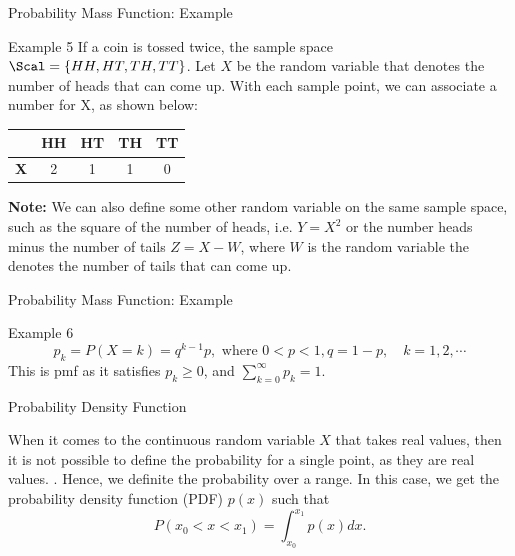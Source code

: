 \documentclass[aspectratio=169,xcolor=dvipsnames,svgnames,x11names,fleqn]{beamer}
\begin{document}
\begin{frame}[containsverbatim]{Probability Mass Function: Example}
    
    
    \begin{exampleblock}{Example 5}
    If a coin is tossed twice, the sample space $\Scal = \{HH, HT, TH, TT\}$. Let $X$ be the random variable that denotes the number of heads that can come up. With each sample point, we can associate a number for X, as shown below:
    
    \begin{tabular}{|c|c|c|c|c|}
    \hline
     & \textbf{HH} & \textbf{HT} & \textbf{TH} & \textbf{TT} \\
    \hline
    \textbf{X} & 2 & 1 & 1 & 0 \\
    \hline
    \end{tabular}
    \newline
    \newline
    \textbf{Note:} We can also define some other random variable on the same sample space, such as the square of the number of heads, i.e. $Y = X^2$ or the number heads minus the number of tails $Z = X - W$, where $W$ is the random variable the denotes the number of tails that can come up.
    \end{exampleblock}

\end{frame}

\begin{frame}[containsverbatim]{Probability Mass Function: Example}
    
    
    \begin{exampleblock}{Example 6}
        \begin{equation}
            p_k = P(X = k) = q^{k-1} p, \text{~where~} 0 < p < 1 , q = 1 - p, \quad k = 1, 2, \cdots
        \end{equation}
        This is pmf as it satisfies $p_k \geq 0$, and $\sum_{k=0}^\infty p_k = 1.$
    \end{exampleblock}

\end{frame}

\begin{frame}[containsverbatim]{Probability Density Function}
    
    
    When it comes to the continuous random variable $X$ that takes real values, then it is not possible to define the probability for a single point, as they are real values. {\color{red}{At what real value we should define a probability -- there can be a possibility of an infinite number after a decimal point!!!}. }
    Hence, we definite the probability over a range. In this case, we get the probability density function (PDF) $p(x)$ such that 
    \begin{equation}
        P(x_0 < x < x_1) = \int_{x_0}^{x_1} p(x)dx.
    \end{equation}

\end{frame}
\end{document}
